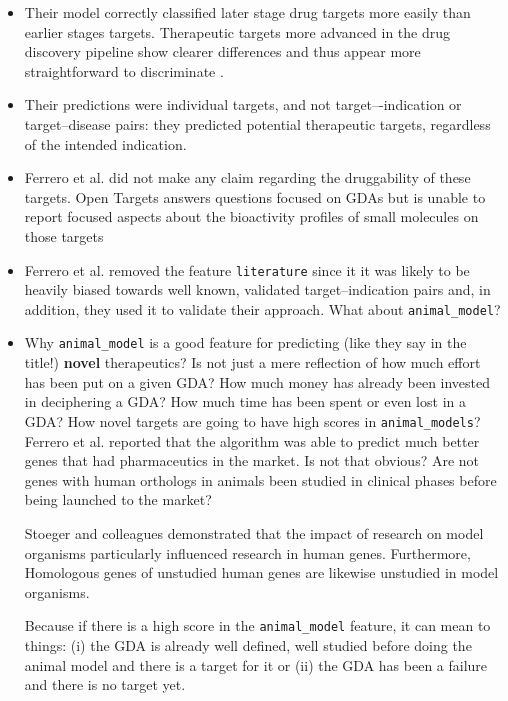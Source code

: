 \begin{itemize}
    \item Their model correctly classified later stage drug targets more easily than earlier stages targets.  Therapeutic targets more advanced in the drug discovery pipeline show clearer differences and thus appear more straightforward to discriminate \cite{ferrero2017}.
    
    \item Their predictions were individual targets, and not target–-indication or target--disease pairs: they predicted potential therapeutic targets, regardless of the intended indication.
    
    \item Ferrero et al. did not make any claim regarding the druggability of these targets. Open Targets answers questions focused on GDAs but is unable to report focused aspects about the bioactivity profiles of small molecules on those targets \cite{brown2018}
    
    \item Ferrero et al. removed the feature \texttt{literature} since it it was likely to be heavily biased towards well known, validated target–indication pairs and, in addition, they used it to validate their approach. What about \texttt{animal\_model}?
    
    \item Why \texttt{animal\_model} is a good feature for predicting (like they say in the title!) \textbf{novel} therapeutics? Is not just a mere reflection of how much effort has been put on a given GDA? How much money has already been invested in deciphering a GDA? How much time has been spent or even lost in a GDA? How novel targets are going to have high scores in \texttt{animal\_models}? Ferrero et al. \cite{ferrero2017} reported that the algorithm was able to predict much better genes that had pharmaceutics in the market. Is not that obvious? Are not genes with human orthologs in animals been studied in clinical phases before being launched to the market?
    
    Stoeger and colleagues \cite{stoeger2018} demonstrated that the impact of research on model organisms particularly influenced research in human genes. Furthermore, Homologous genes of unstudied human genes are likewise unstudied in model organisms.
    
    Because if there is a high score in the \texttt{animal\_model} feature, it can mean to things: (i) the GDA is already well defined, well studied before doing the animal model and there is a target for it or (ii) the GDA has been a failure and there is no target yet.
\end{itemize}

